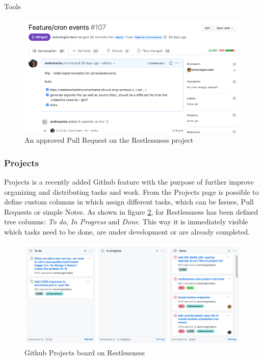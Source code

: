 \begin{chapter}{Tools}
    \begin{figure}
        \centering
        \includegraphics[width=\linewidth]{source/images/rln-pull-request.png}
        \caption{An approved Pull Request on the Restlessness project}
        \label{fig:rln_pull_request}
    \end{figure}

    \subsubsection{Projects}
    Projects is a recently added Github feature with the purpose of further improve
    organizing and distributing tasks and work. From the Projects page is possible
    to define custom columns in which assign different tasks, which can be Issues,
    Pull Requests or simple Notes. As shown in figure \ref{fig:rln_project_board},
    for Restlessness has been defined tree columns: \textit{To do},
    \textit{In Progress} and \textit{Done}. This way it is immediately visible which
    tasks need to be done, are under development or are already completed.

    \begin{figure}
        \centering
        \includegraphics[width=\linewidth]{source/images/rln-github-project-board.png}
        \caption{Github Projects board on Restlessness}
        \label{fig:rln_project_board}
    \end{figure}


\end{chapter}

